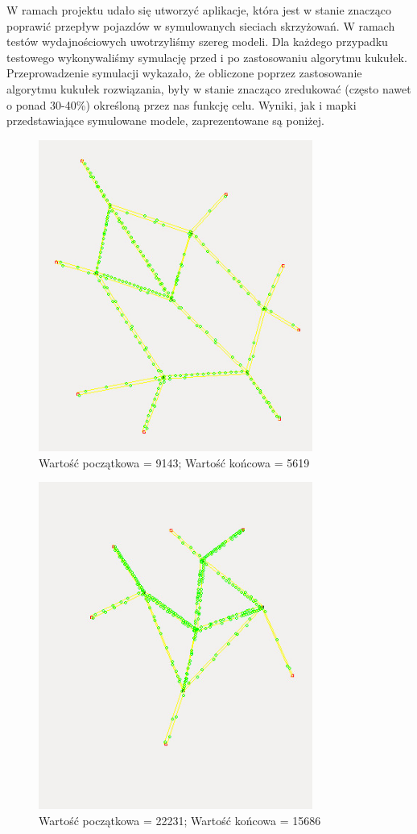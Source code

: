 \documentclass{article}
\begin{document}
W ramach projektu udało się utworzyć aplikacje, która jest w stanie znacząco poprawić przepływ pojazdów w symulowanych sieciach skrzyżowań. W ramach testów wydajnościowych uwotrzyliśmy szereg modeli. Dla każdego przypadku testowego wykonywaliśmy symulację przed i po zastosowaniu algorytmu kukułek. Przeprowadzenie symulacji wykazało, że obliczone poprzez zastosowanie algorytmu kukułek rozwiązania, były w stanie znacząco zredukować (często nawet o ponad 30-40\%) określoną przez nas funkcję celu. Wyniki, jak i mapki przedstawiające symulowane modele, zaprezentowane są poniżej.

\begin{figure}[ht!]
\centering
\includegraphics[width=90mm]{map1.jpg}
\caption{Wartość początkowa = 9143; Wartość końcowa = 5619}
\label{overflow}
\end{figure}


\begin{figure}[ht!]
\centering
\includegraphics[width=90mm]{map2.jpg}
\caption{Wartość początkowa = 22231; Wartość końcowa = 15686 }
\label{overflow}
\end{figure}
\end{document}
